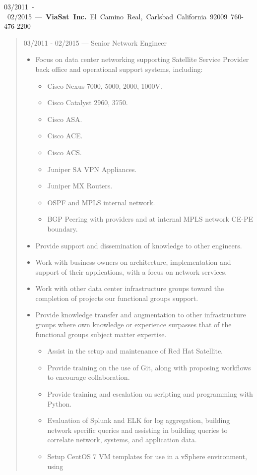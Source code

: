 \mbox{03/2011 - 02/2015 --- {\bf ViaSat Inc.} El Camino Real, Carlsbad California 92009 760-476-2200}
\begin{quote}
03/2011 - 02/2015 --- Senior Network Engineer\\
\begin{itemize}
\item Focus on data center networking supporting Satellite Service Provider
back office and operational support systems, including:
\begin{itemize}
\item Cisco Nexus 7000, 5000, 2000, 1000V.
\item Cisco Catalyst 2960, 3750.
\item Cisco ASA.
\item Cisco ACE.
\item Cisco ACS.
\item Juniper SA VPN Appliances.
\item Juniper MX Routers.
\item OSPF and MPLS internal network.
\item BGP Peering with providers and at internal MPLS network CE-PE boundary.
\end{itemize}
\item Provide support and dissemination of knowledge to other engineers.
\item Work with business owners on architecture, implementation and support of
their applications, with a focus on network services.
\item Work with other data center infrastructure groups toward the completion of
projects our functional groups support.
\item Provide knowledge transfer and augmentation to other infrastructure groups
where own knowledge or experience surpasses that of the functional groups
subject matter expertise.
\begin{itemize}
\item Assist in the setup and maintenance of Red Hat Satellite.
\item Provide training on the use of Git, along with proposing workflows to
encourage collaboration.
\item Provide training and escalation on scripting and programming with Python.
\item Evaluation of Splunk and ELK for log aggregation, building network
specific queries and assisting in building queries to correlate network,
systems, and application data.
\item Setup CentOS 7 VM templates for use in a vSphere environment, using

\end{itemize}
\end{itemize}
\end{quote}
